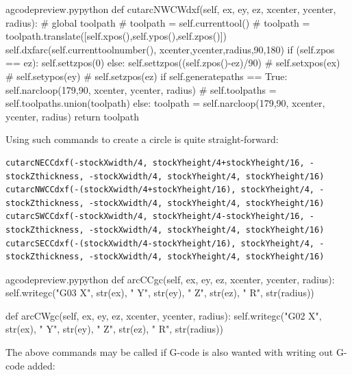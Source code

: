 \documentclass{ltxdoc}
\begin{document}
\begin{writecode}{a}{gcodepreview.py}{python}
    def cutarcNWCWdxf(self, ex, ey, ez, xcenter, ycenter, radius):
#        global toolpath
#        toolpath = self.currenttool()
#        toolpath = toolpath.translate([self.xpos(),self.ypos(),self.zpos()])
        self.dxfarc(self.currenttoolnumber(), xcenter,ycenter,radius,90,180)
        if (self.zpos == ez):
            self.settzpos(0)
        else:         
            self.settzpos((self.zpos()-ez)/90)
#        self.setxpos(ex)
#        self.setypos(ey)
#        self.setzpos(ez)
        if self.generatepaths == True:
            self.narcloop(179,90, xcenter, ycenter, radius)
#            self.toolpaths = self.toolpaths.union(toolpath)
        else:
            toolpath = self.narcloop(179,90, xcenter, ycenter, radius)
            return toolpath

\end{writecode}
\addtocounter{gcpy}{120}

Using such commands to create a circle is quite straight-forward:

\begin{verbatim}
cutarcNECCdxf(-stockXwidth/4, stockYheight/4+stockYheight/16, -stockZthickness, -stockXwidth/4, stockYheight/4, stockYheight/16)
cutarcNWCCdxf(-(stockXwidth/4+stockYheight/16), stockYheight/4, -stockZthickness, -stockXwidth/4, stockYheight/4, stockYheight/16)
cutarcSWCCdxf(-stockXwidth/4, stockYheight/4-stockYheight/16, -stockZthickness, -stockXwidth/4, stockYheight/4, stockYheight/16)
cutarcSECCdxf(-(stockXwidth/4-stockYheight/16), stockYheight/4, -stockZthickness, -stockXwidth/4, stockYheight/4, stockYheight/16)
\end{verbatim}

\lstset{firstnumber=\thegcpy}
\begin{writecode}{a}{gcodepreview.py}{python}
    def arcCCgc(self, ex, ey, ez, xcenter, ycenter, radius):
        self.writegc("G03 X", str(ex), " Y", str(ey), " Z", str(ez), " R", str(radius))
           
    def arcCWgc(self, ex, ey, ez, xcenter, ycenter, radius):
        self.writegc("G02 X", str(ex), " Y", str(ey), " Z", str(ez), " R", str(radius))
           
\end{writecode}
\addtocounter{gcpy}{6}

The above commands may be called if G-code is also wanted with writing out G-code added:
\end{document}
